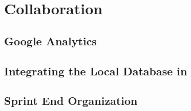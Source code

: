 \chapter{Collaboration}\label{chap:collaboration}


\section{Google Analytics}


\section{Integrating the Local Database in \launcher}\label{sec:collab:localdbtolauncher}


\section{Sprint End Organization}\label{sec:collab:sprintend}
